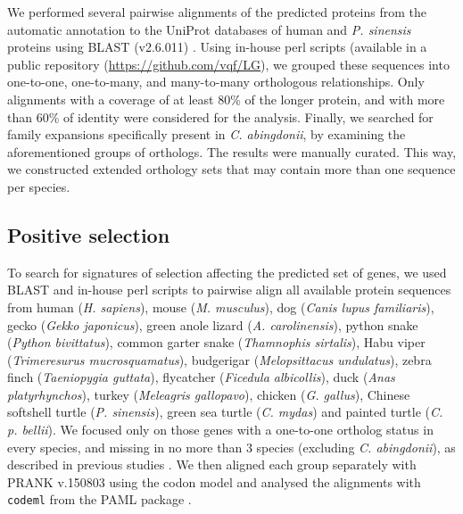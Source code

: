 We performed several pairwise alignments of the predicted proteins from the automatic annotation to the UniProt \cite{Bateman2019} databases of human and \textit{P. sinensis} proteins using BLAST (v2.6.011) \cite{Altschul1990}.
Using in-house perl scripts (available in a public repository (\href{https://github.com/vqf/LG}{https://github.com/vqf/LG}), we grouped these sequences into one-to-one, one-to-many, and many-to-many orthologous relationships.
Only alignments with a coverage of at least 80\% of the longer protein, and with more than 60\% of identity were considered for the analysis.
Finally, we searched for family expansions specifically present in \textit{C. abingdonii}, by examining the aforementioned groups of orthologs.
The results were manually curated.
This way, we constructed extended orthology sets that may contain more than one sequence per species.

\subsection{Positive selection} \label{ss_matmet_bioinformatics_positive_selection}

To search for signatures of selection affecting the predicted set of genes, we used BLAST and in-house perl scripts to pairwise align all available protein sequences from human (\textit{H. sapiens}), mouse (\textit{M. musculus}), dog (\textit{Canis lupus familiaris}), gecko (\textit{Gekko japonicus}), green anole lizard (\textit{A. carolinensis}), python snake (\textit{Python bivittatus}), common garter snake (\textit{Thamnophis sirtalis}), Habu viper (\textit{Trimeresurus mucrosquamatus}), budgerigar (\textit{Melopsittacus undulatus}), zebra finch (\textit{Taeniopygia guttata}), flycatcher (\textit{Ficedula albicollis}), duck (\textit{Anas platyrhynchos}), turkey (\textit{Meleagris gallopavo}), chicken (\textit{G. gallus}), Chinese softshell turtle (\textit{P. sinensis}), green sea turtle (\textit{C. mydas}) and painted turtle (\textit{C. p. bellii}).
We focused only on those genes with a one-to-one ortholog status in every species, and missing in no more than 3 species (excluding \textit{C. abingdonii}), as described in previous studies \cite{Keane2015}.
We then aligned each group separately with PRANK v.150803 using the codon model and analysed the alignments with \texttt{codeml} from the PAML package \cite{Yang2007}.

